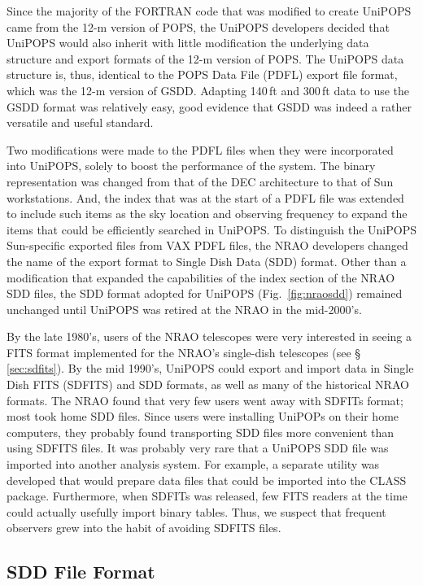 \documentclass[final,authoryear,5p,times,twocolumn]{elsarticle}
\begin{document}
Since the majority of the FORTRAN code that was modified to create
UniPOPS came from the 12-m version of POPS, the UniPOPS developers
decided that UniPOPS would also inherit with little modification the
underlying data structure and export formats of the 12-m version of
POPS.  The UniPOPS data structure is, thus, identical to the POPS Data File
(PDFL) export file format, which was the 12-m version of GSDD.  Adapting 140\,ft
and 300\,ft data to use the GSDD format was
relatively easy, good evidence that GSDD was indeed a rather versatile
and useful standard.

Two modifications were made to the PDFL files when they were
incorporated into UniPOPS, solely to boost the performance of the
system.  The binary representation was changed from that of the DEC
architecture to that of Sun workstations.  And, the index that was at
the start of a PDFL file was extended to include such items as the sky
location and observing frequency to expand the items that could be
efficiently searched in UniPOPS.  To distinguish the UniPOPS
Sun-specific exported files from VAX PDFL files, the NRAO developers
changed the name of the export format to Single Dish Data (SDD) format.
Other than a modification that expanded the capabilities of the index
section of the NRAO SDD files, the SDD format adopted for UniPOPS
(Fig.~\ref{fig:nraosdd}) remained unchanged until UniPOPS was retired
at the NRAO in the mid-2000's.

By the late 1980's, users of the NRAO telescopes were very interested
in seeing a FITS format implemented for the NRAO's single-dish
telescopes (see \S\,\ref{sec:sdfits}). By the mid 1990's,
UniPOPS could export and import data in Single Dish FITS (SDFITS) and
SDD formats, as well as many
of the historical NRAO formats.  The NRAO found that very few users
went away with SDFITs format; most took home SDD files.  Since
users were installing UniPOPs on their home computers, they probably
found transporting SDD files more convenient than using
SDFITS files.  It was probably very rare that a UniPOPS SDD file was
imported into another analysis system.  For example, a separate
utility was developed that would prepare data files that could be
imported into the {\textsc CLASS} package.
Furthermore, when SDFITs was released, few FITS readers at the
time could actually usefully import binary tables.  Thus, we suspect
that frequent observers grew into the habit of avoiding SDFITS files.

\subsection{SDD File Format}
\end{document}
